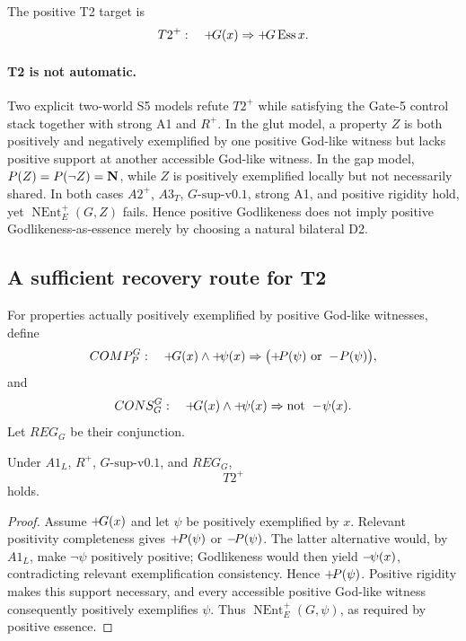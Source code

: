 The positive T2 target is
\[
  T2^+:\quad
  +\!G(x)\Rightarrow+\!G\operatorname{Ess}x.
\]

\paragraph{T2 is not automatic.}
Two explicit two-world S5 models refute \(T2^+\) while satisfying the Gate-5 control stack together with strong A1 and \(R^+\). In the glut model, a property \(Z\) is both positively and negatively exemplified by one positive God-like witness but lacks positive support at another accessible God-like witness. In the gap model, \(P(Z)=P(\neg Z)=\mathbf{N}\), while \(Z\) is positively exemplified locally but not necessarily shared. In both cases \(A2^+\), \(A3_T\), \(G\text{-sup-v0.1}\), strong A1, and positive rigidity hold, yet \(\operatorname{NEnt}^{+}_{E}(G,Z)\) fails. Hence positive Godlikeness does not imply positive Godlikeness-as-essence merely by choosing a natural bilateral D2.

\subsection{A sufficient recovery route for T2}

For properties actually positively exemplified by positive God-like witnesses, define
\[
  COMP_P^G:
  \quad
  +\!G(x)\land+\!\psi(x)
  \Rightarrow
  \bigl(+\!P(\psi)\text{ or }-\!P(\psi)\bigr),
\]
and
\[
  CONS_G^G:
  \quad
  +\!G(x)\land+\!\psi(x)
  \Rightarrow
  \text{not }-\!\psi(x).
\]
Let \(REG_G\) be their conjunction.

\begin{theorem}
Under \(A1_L\), \(R^+\), \(G\text{-sup-v0.1}\), and \(REG_G\),
\[
  T2^+
\]
holds.
\end{theorem}
\begin{proof}
Assume \(+\!G(x)\) and let \(\psi\) be positively exemplified by \(x\). Relevant positivity completeness gives \(+\!P(\psi)\) or \(-\!P(\psi)\). The latter alternative would, by \(A1_L\), make \(\neg\psi\) positively positive; Godlikeness would then yield \(-\!\psi(x)\), contradicting relevant exemplification consistency. Hence \(+\!P(\psi)\). Positive rigidity makes this support necessary, and every accessible positive God-like witness consequently positively exemplifies \(\psi\). Thus \(\operatorname{NEnt}^{+}_{E}(G,\psi)\), as required by positive essence.
\end{proof}

